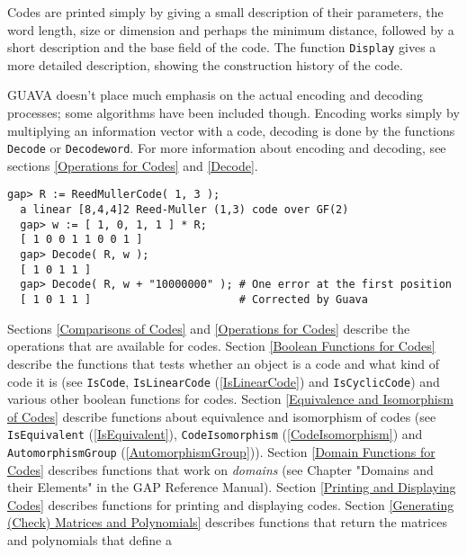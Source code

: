 \documentclass[a4paper,11pt]{report}
\begin{document}
{ Codes are printed simply by giving a small description of their parameters,
the word length, size or dimension and perhaps the minimum distance, followed
by a short description and the base field of the code. The function \texttt{Display} gives a more detailed description, showing the construction history of the
code. 

 \textsf{GUAVA} doesn't place much emphasis on the actual encoding and decoding processes;
some algorithms have been included though. Encoding works simply by
multiplying an information vector with a code, decoding is done by the
functions \texttt{Decode} or \texttt{Decodeword}. For more information about encoding and decoding, see sections \ref{Operations for Codes} and \ref{Decode}. 
\begin{Verbatim}[fontsize=\small,frame=single,label=Example]
  gap> R := ReedMullerCode( 1, 3 );
  a linear [8,4,4]2 Reed-Muller (1,3) code over GF(2)
  gap> w := [ 1, 0, 1, 1 ] * R;
  [ 1 0 0 1 1 0 0 1 ]
  gap> Decode( R, w );
  [ 1 0 1 1 ]
  gap> Decode( R, w + "10000000" ); # One error at the first position
  [ 1 0 1 1 ]                       # Corrected by Guava 
\end{Verbatim}
  Sections \ref{Comparisons of Codes} and \ref{Operations for Codes} describe the operations that are available for codes. Section \ref{Boolean Functions for Codes} describe the functions that tests whether an object is a code and what kind of
code it is (see \texttt{IsCode}, \texttt{IsLinearCode} (\ref{IsLinearCode}) and \texttt{IsCyclicCode}) and various other boolean functions for codes. Section \ref{Equivalence and Isomorphism of Codes} describe functions about equivalence and isomorphism of codes (see \texttt{IsEquivalent} (\ref{IsEquivalent}), \texttt{CodeIsomorphism} (\ref{CodeIsomorphism}) and \texttt{AutomorphismGroup} (\ref{AutomorphismGroup})). Section \ref{Domain Functions for Codes} describes functions that work on \emph{domains} (see Chapter "Domains and their Elements" in the GAP Reference Manual).
Section \ref{Printing and Displaying Codes} describes functions for printing and displaying codes. Section \ref{Generating (Check) Matrices and Polynomials} describes functions that return the matrices and polynomials that define a
}
\end{document}
